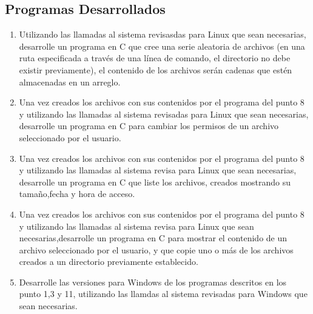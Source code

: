 \documentclass[12pt]{article}
\begin{document}
\subsection{Programas Desarrollados}
    \begin{enumerate}
        \item Utilizando las llamadas al sistema revisasdas para Linux que sean necesarias, desarrolle un programa en C que cree una serie aleatoria de archivos (en una ruta especificada a través de una línea de comando, el directorio no debe existir previamente), el contenido de los archivos serán cadenas que estén almacenadas en un arreglo.
        \item Una vez creados los archivos con sus contenidos por el programa del punto 8 y utilizando las llamadas al sistema revisadas para Linux que sean necesarias, desarrolle un programa en C para cambiar los permisos de un archivo seleccionado por el usuario.
        \item Una vez creados los archivos con sus contenidos por el programa del punto 8 y utilizando las llamadas al sistema revisa para Linux que sean necesarias, desarrolle un programa en C que liste los archivos, creados mostrando su tamaño,fecha y hora de acceso.
        \item Una vez creados los archivos con sus contenidos por el programa del punto 8 y utilizando las llamadas al sistema revisa para Linux que sean necesarias,desarrolle un programa en C para mostrar el contenido de un archivo seleccionado por el usuario, y que copie uno o más de los archivos creados a un directorio previamente establecido.
        \item Desarrolle las versiones para Windows de los programas descritos en los punto 1,3 y 11, utilizando las llamdas al sistema revisadas para Windows que sean necesarias. 
    \end{enumerate}
\end{document}
